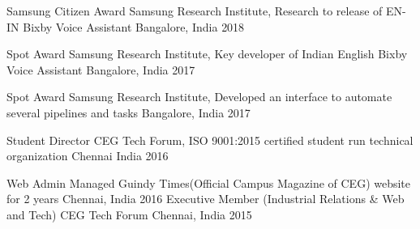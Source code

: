 



\begin{cvhonors}


  \cvhonor
    {Samsung Citizen Award} %
    {Samsung Research Institute, Research to release of EN-IN Bixby Voice Assistant} %
    {Bangalore, India} %
    {2018} %

  \cvhonor
    {Spot Award} %
    {Samsung Research Institute, Key developer of Indian English Bixby Voice Assistant} %
    {Bangalore, India} %
    {2017} %

  \cvhonor
    {Spot Award} %
    {Samsung Research Institute, Developed an interface to automate several pipelines and tasks} %
    {Bangalore, India} %
    {2017} %

  \cvhonor
    {Student Director} %
    {CEG Tech Forum, ISO 9001:2015 certified student run technical organization} %
    {Chennai India} %
    {2016} %

  \cvhonor
  {Web Admin} %
  {Managed Guindy Times(Official Campus Magazine of CEG) website for 2 years} %
  {Chennai, India} %
  {2016} %
%
  \cvhonor
    {Executive Member (Industrial Relations \& Web and Tech)} %
    {CEG Tech Forum} %
    {Chennai, India} %
    {2015} %
%
%

\end{cvhonors}
